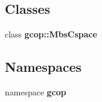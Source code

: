\subsection*{\-Classes}
\begin{DoxyCompactItemize}
\item 
class {\bf gcop\-::\-Mbs\-Cspace}
\end{DoxyCompactItemize}
\subsection*{\-Namespaces}
\begin{DoxyCompactItemize}
\item 
namespace {\bf gcop}
\end{DoxyCompactItemize}
